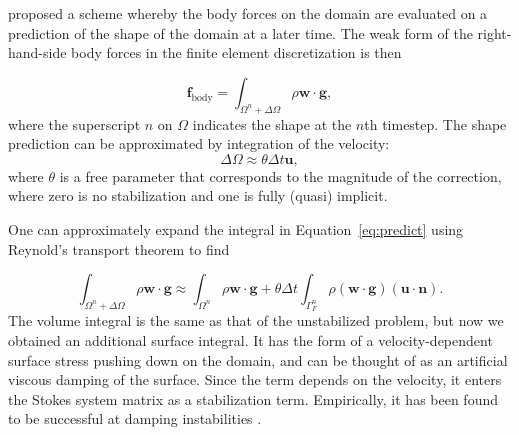 \documentclass[preprint,12pt,authoryear]{elsarticle}
\begin{document}
\citet{kaus2010stabilization} proposed a scheme whereby the body forces on the domain are 
evaluated on a prediction of the shape of the domain at a later time.
The weak form of the right-hand-side body forces in the finite element discretization is then

\begin{equation}
\mathbf{f}_{\mathrm{body}} = \int_{\Omega^n + \Delta \Omega} \rho \mathbf{w} \cdot \mathbf{g},
\label{eq:predict}
\end{equation}
where the superscript $n$ on $\Omega$ indicates the shape at the $n$th timestep.
The shape prediction can be approximated by integration of the velocity:
\begin{equation}
\Delta \Omega \approx \theta \Delta t \mathbf{u},
\end{equation}
where $\theta$ is a free parameter that corresponds to the magnitude of the 
correction, where zero is no stabilization and one is fully (quasi) implicit.

One can approximately expand the integral in Equation~\eqref{eq:predict} using 
Reynold's transport theorem to find

\begin{equation}
\int_{\Omega^n + \Delta \Omega} \rho  \mathbf{w} \cdot \mathbf{g} \approx
\int_{\Omega^n} \rho  \mathbf{w} \cdot \mathbf{g} + \theta \Delta t \int_{\Gamma_F^n} \rho ( \mathbf{w \cdot g}) (\mathbf{u \cdot n} ).
\label{eq:kmm}
\end{equation}
The volume integral is the same as that of the unstabilized problem, but now we obtained an additional surface integral.
It has the form of a velocity-dependent surface stress pushing down on the 
domain, and can be thought of as an artificial viscous damping of the surface.
Since the term depends on the velocity, it 
enters the Stokes system matrix as a stabilization term.  
Empirically, it has been found to be successful at damping instabilities \citep{kaus2010stabilization, quinquis2011role, duretz2011discretization}.
\end{document}
